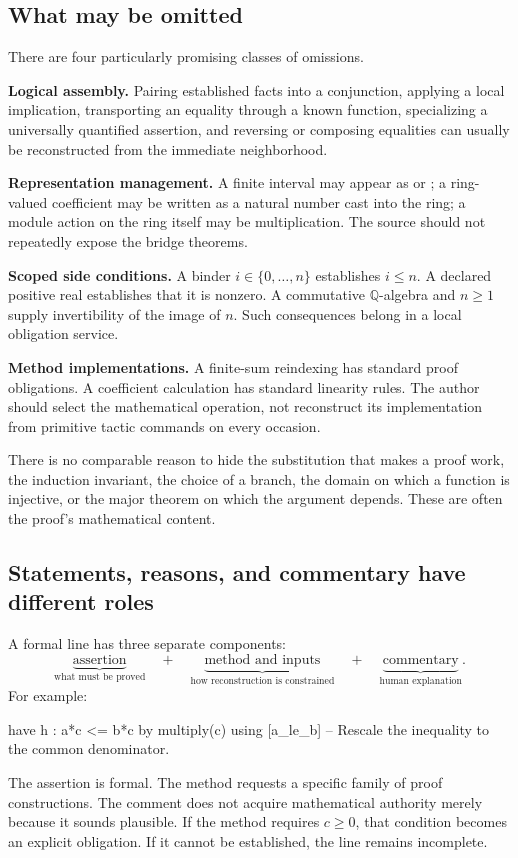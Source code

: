 \documentclass[11pt,a4paper]{article}
\newcommand{\QQ}{\mathbb Q}
\begin{document}
\subsection{What may be omitted}

There are four particularly promising classes of omissions.

\textbf{Logical assembly.} Pairing established facts into a conjunction, applying a local implication, transporting an equality through a known function, specializing a universally quantified assertion, and reversing or composing equalities can usually be reconstructed from the immediate neighborhood.

\textbf{Representation management.} A finite interval may appear as \texttt{} or \texttt{}; a ring-valued coefficient may be written as a natural number cast into the ring; a module action on the ring itself may be multiplication. The source should not repeatedly expose the bridge theorems.

\textbf{Scoped side conditions.} A binder $i\in\{0,\ldots,n\}$ establishes $i\le n$. A declared positive real establishes that it is nonzero. A commutative $\QQ$-algebra and $n\ge1$ supply invertibility of the image of $n$. Such consequences belong in a local obligation service.

\textbf{Method implementations.} A finite-sum reindexing has standard proof obligations. A coefficient calculation has standard linearity rules. The author should select the mathematical operation, not reconstruct its implementation from primitive tactic commands on every occasion.

There is no comparable reason to hide the substitution that makes a proof work, the induction invariant, the choice of a branch, the domain on which a function is injective, or the major theorem on which the argument depends. These are often the proof's mathematical content.

\subsection{Statements, reasons, and commentary have different roles}

A formal line has three separate components:
\[
 \underbrace{\text{assertion}}_{\text{what must be proved}}
 \quad+\quad
 \underbrace{\text{method and inputs}}_{\text{how reconstruction is constrained}}
 \quad+\quad
 \underbrace{\text{commentary}}_{\text{human explanation}}.
\]
For example:
\par\noindent\begin{minipage}{\linewidth}
\begin{rawcode}
have h : a*c <= b*c
  by multiply(c) using [a_le_b]
  -- Rescale the inequality to the common denominator.
\end{rawcode}
\end{minipage}\par
The assertion is formal. The method requests a specific family of proof constructions. The comment does not acquire mathematical authority merely because it sounds plausible. If the method requires $c\ge0$, that condition becomes an explicit obligation. If it cannot be established, the line remains incomplete.
\end{document}
